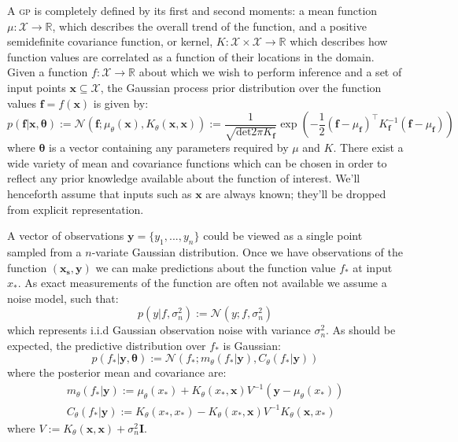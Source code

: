 \documentclass{article}
\newcommand{\vect}[1]{\mathbf{#1}}
\newcommand{\xd}{\vect{x}}
\newcommand{\yd}{\vect{y}}
\renewcommand{\sc}[1]{{\scshape #1}}
\begin{document}
A \sc{gp} is completely defined by its first and second moments: a mean function $\mu : \mathcal{X} \rightarrow \mathbb{R}$, which describes the overall trend of the function, and a positive semidefinite covariance function, or kernel, $K : \mathcal{X} \times \mathcal{X} \rightarrow \mathbb{R}$ which describes how function values are correlated as a function of their locations in the domain. Given a function $f : \mathcal{X} \rightarrow \mathbb{R}$ about which we wish to perform inference and a set of input points $\mathbf{x} \subseteq \mathcal{X}$, the Gaussian process prior distribution over the function values $\mathbf{f} = f(\mathbf{x})$ is given by:
\begin{equation}
p(\mathbf{f} | \mathbf{x},\bm{\theta}) := \mathcal{N}\left( \mathbf{f};\mu_\theta(\mathbf{x}),K_\theta(\mathbf{x},\mathbf{x}) \right) \nonumber:= \frac{1}{\sqrt{\mathrm{det} 2 \pi K_{\mathbf{f}}} } \exp \left( - \frac{1}{2} (\mathbf{f}-\mu_{\mathbf{f}})^\top K_\mathbf{f}^{-1} (\mathbf{f}-\mu_{\mathbf{f}})  \right)
\end{equation}
where $\bm{\theta}$ is a vector containing any parameters required by $\mu$ and $K$.
There exist a wide variety of mean and covariance functions which can be chosen in order to reflect any prior knowledge available about the function of interest. We'll henceforth assume that inputs such as $\mathbf{x}$ are always known; they'll be dropped from explicit representation.  

A vector of observations $\mathbf{y} = \{ y_1,...,y_n\}$ could be viewed as a single point sampled from a $n$-variate Gaussian distribution. Once we have observations of the function $(\mathbf{x_s},\yd)$ we can make predictions about the function value $f_*$ at input $x_*$. As exact measurements of the function are often not available we assume a noise model, such that:
\begin{equation}\label{obsnoise}
p(y | f, \sigma_n^2) := \mathcal{N}(y; f, \sigma_n^2)
\end{equation} 
which represents i.i.d Gaussian observation noise with variance $\sigma_n^2$. As should be expected, the predictive distribution over $f_*$ is Gaussian:
\begin{equation}\label{posteriorpred}
p(f_* | \yd,\bm{\theta}) := \mathcal{N} ( f_* ; m_\theta(f_* | \yd), C_\theta(f_* | \yd))
\end{equation}
where the posterior mean and covariance are:
\begin{align}
m_\theta(f_* | \yd) := \mu_\theta(x_*) + K_\theta(x_*,\xd)V^{-1}(\yd - \mu_\theta(x_*))\\
C_\theta(f_* | \yd) := K_\theta(x_*,x_*) - K_\theta(x_*,\xd)V^{-1}K_\theta(\xd,x_*)
\end{align}
where $V := K_\theta(\xd,\xd) + \sigma_n^2\mathbf{I}$.
\end{document}
